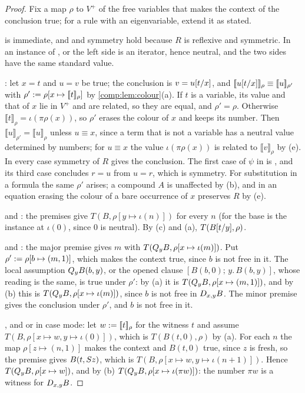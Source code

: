 \begin{proof}
Fix a map $\rho$ to $V^{+}$ of the free variables that makes the context of
the conclusion true; for a rule with an eigenvariable, extend it as stated.

 is immediate, and  and symmetry hold because
$R$ is reflexive and symmetric. In an instance of ,
 or  the left side is an iterator, hence
neutral, and the two sides have the same standard value.

: let $x=t$ and $u=v$ be true; the conclusion is
$v=u[t/x]$, and $[\![ u[t/x]]\!]_\rho\equiv
[\![ u]\!]_{\rho'}$ with $\rho'\mathrel{:=}\rho[x\mapsto[\![
t]\!]_\rho]$ by \cref{comp:lem:colour}(a). If $t$ is a variable, its
value and that of $x$ lie in $V^{+}$ and are related, so they are equal, and
$\rho'=\rho$. Otherwise $\llbracket t\rrbracket_\rho=\iota(\pi\rho(x))$, so
$\rho'$ erases the colour of $x$ and keeps its number. Then
$\llbracket u\rrbracket_{\rho'}=\llbracket u\rrbracket_\rho$ unless $u\equiv x$,
since a term that is not a variable has a neutral value determined by
numbers; for $u\equiv x$ the value $\iota(\pi\rho(x))$ is related to
$\llbracket v\rrbracket_\rho$ by (e). In every case symmetry of $R$ gives the
conclusion. The first case of $\psi$ in  is ,
and its third case concludes $r=u$ from $u=r$, which is symmetry. For
substitution in a formula the same $\rho'$ arises; a compound $A$ is
unaffected by (b), and in an equation erasing the colour of a bare
occurrence of $x$ preserves $R$ by (e).

 and : the premises give
$T(B,\rho[y\mapsto\iota(n)])$ for every $n$ (for  the base is
the instance at $\iota(0)$, since $0$ is neutral). By (c) and (a),
$T(B[t/y],\rho)$.

 and : the major premise gives $m$ with
$T(Q_{y}B,\rho[x\mapsto\iota(m)])$. Put $\rho'\mathrel{:=}\rho[b\mapsto(m,1)]$,
which makes the context true, since $b$ is not free in it. The local
assumption $Q_{y}B(b,y)$, or the opened clause $[B(b,0);\,y.\,B(b,y)]$,
whose reading is the same, is true under $\rho'$: by (a) it is
$T(Q_{y}B,\rho[x\mapsto(m,1)])$, and by (b) this is
$T(Q_{y}B,\rho[x\mapsto\iota(m)])$, since $b$ is not free in $D_{x,y}B$. The
minor premise gives the conclusion under $\rho'$, and $b$ is not free in it.

, and  or  in case mode: let
$w\mathrel{:=}[\![ t]\!]_\rho$ for the witness $t$ and assume
$T(B,\rho[x\mapsto w,y\mapsto\iota(0)])$, which is $T(B(t,0),\rho)$ by (a).
For each $n$ the map $\rho[z\mapsto(n,1)]$ makes the context and $B(t,0)$
true, since $z$ is fresh, so the premise gives $B(t,S z)$, which is
$T(B,\rho[x\mapsto w,y\mapsto\iota(n+1)])$. Hence
$T(Q_{y}B,\rho[x\mapsto w])$, and by (b)
$T(Q_{y}B,\rho[x\mapsto\iota(\pi w)])$: the number $\pi w$ is a witness for
$D_{x,y}B$.


\end{proof}
